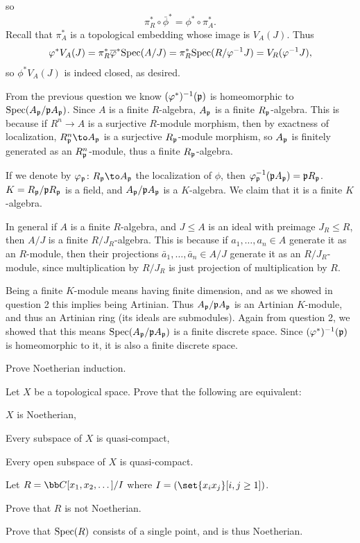     so
    $$ \pi_R^*\circ\bar\phi^* = \phi^*\circ\pi_A^* . $$
    Recall that $\pi_A^*$ is a topological embedding whose image is $V_A(J)$.
    Thus
    $$ \varphi^*V_A(J) = \pi_R^*{\overline{\varphi}}^*{\rm Spec}(A/J) = \pi_R^*{\rm Spec}(R/\varphi^{-1}J) = V_R(\varphi^{-1}J) , $$
    so $\phi^*V_A(J)$ is indeed closed, as desired.

    \item From the previous question we know $(\varphi^*)^{-1}({{\frak p}})$ is homeomorphic to ${\rm Spec}(A_{{\frak p}}/{{\frak p}} A_{{\frak p}})$.
    Since $A$ is a finite $R$-algebra, $A_{{\frak p}}$ is a finite $R_{{\frak p}}$-algebra.
    This is because if $R^n\to A$ is a surjective $R$-module morphism, then by exactness of localization,
    $R^n_\p\to A_\p$ is a surjective $R_{{\frak p}}$-module morphism, so $A_{{\frak p}}$ is finitely generated as an $R^n_{{\frak p}}$-module,
    thus a finite $R_{{\frak p}}$-algebra.

    If we denote by $\phi_\p\colon R_\p\to A_\p$ the localization of $\phi$, then $\varphi_{{\frak p}}^{-1}({{\frak p}} A_{{\frak p}})={{\frak p}} R_{{\frak p}}$.
    $K=R_{{\frak p}}/{{\frak p}} R_{{\frak p}}$ is a field, and $A_{{\frak p}}/{{\frak p}} A_{{\frak p}}$ is a $K$-algebra.
    We claim that it is a finite $K$-algebra.

    In general if $A$ is a finite $R$-algebra, and $J\leq A$ is an ideal with preimage $J_R\leq R$,
    then $A/J$ is a finite $R/J_R$-algebra.
    This is because if $a_1,\dots,a_n\in A$ generate it as an $R$-module, then their projections
    $\bar a_1,\dots,\bar a_n\in A/J$ generate it as an $R/J_R$-module, since multiplication by $R/J_R$ is just projection
    of multiplication by $R$.

    Being a finite $K$-module means having finite dimension, and as we showed in question 2 this implies being Artinian.
    Thus $A_{{\frak p}}/{{\frak p}} A_{{\frak p}}$ is an Artinian $K$-module, and thus an Artinian ring (its ideals are submodules).
    Again from question 2, we showed that this means ${\rm Spec}(A_{{\frak p}}/{{\frak p}} A_{{\frak p}})$ is a finite discrete space.
    Since $(\varphi^*)^{-1}({{\frak p}})$ is homeomorphic to it, it is also a finite discrete space.
\eenum

\bprob

    \benum
        \item Prove Noetherian induction.
        \item Let $X$ be a topological space.
        Prove that the following are equivalent:
        \benum
            \item $X$ is Noetherian,
            \item Every subspace of $X$ is quasi-compact,
            \item Every open subspace of $X$ is quasi-compact.
        \eenum
        \item Let $R=\bC[x_1,x_2,\dots]/I$ where $I=(\set{x_ix_j}[i,j\geq1])$.
        \benum
            \item Prove that $R$ is not Noetherian.
            \item Prove that ${\rm Spec}(R)$ consists of a single point, and is thus Noetherian.
        \eenum
    \eenum

